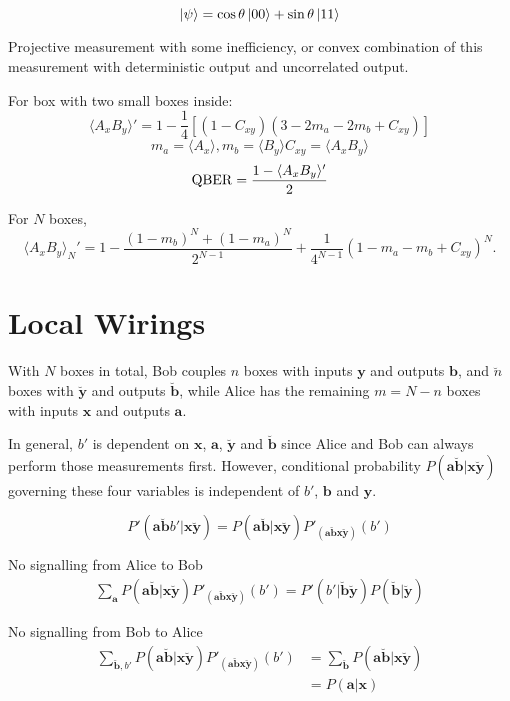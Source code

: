 \documentclass[10pt, a4paper]{article}
\newcommand{\?}{\mathrel{?}} %
\newcommand{\cvec}[1]{\boldsymbol{\mathbf{#1}}}    %
\numberwithin{equation}{section} %
\theoremstyle{definition}
\theoremstyle{plain}
\theoremstyle{plain}
\begin{document}
  \[ \ket{\psi} = \cos \theta \ket{00} + \sin \theta \ket{11} \]

  Projective measurement with some inefficiency, or convex combination of this measurement with deterministic output and uncorrelated output.

  For box with two small boxes inside:
  \[ \langle A_x B_y \rangle' = 1 - \frac{1}{4} \left[ (1 - C_{xy}) (3 - 2m_a - 2 m_b + C_{xy} ) \right] \]
      \[ m_a = \langle A_x \rangle, m_b = \langle B_y \rangle C_{xy} = \langle A_x B_y \rangle \]
      \[ {\rm QBER} = \frac{1 - \langle A_x B_y \rangle'}{2} \]

      For \(N\) boxes,
    \[ \langle A_x B_y \rangle_{N}' = 1 - \frac{{(1-m_b)}^N + {(1-m_a)}^N}{2^{N-1}} + \frac{1}{4^{N-1}} {(1-m_a-m_b+C_{xy})}^{N}. \]

    \section{Local Wirings}

    With \(N\) boxes in total, Bob couples \(n\) boxes with inputs \(\cvec{y}\) and outputs \(\cvec{b}\), and \(\breve{n}\) boxes with \(\breve{\cvec{y}}\) and outputs \(\breve{\cvec{b}}\), while Alice has the remaining \(m = N - n\) boxes with inputs \(\cvec{x}\) and outputs \(\cvec{a}\).

    In general, \(b'\) is dependent on \(\cvec{x}\), \(\cvec{a}\), \(\breve{\cvec{y}}\) and \(\breve{\cvec{b}}\) since Alice and Bob can always perform those measurements first. However, conditional probability \(P(\cvec{a}\breve{\cvec{b}}|\cvec{x}\breve{\cvec{y}})\) governing these four variables is independent of \(b'\), \(\cvec{b}\) and \(\cvec{y}\).

    \[ P'(\cvec{a}\breve{\cvec{b}}b'|\cvec{x}\breve{\cvec{y}}) = P(\cvec{a}\breve{\cvec{b}}|\cvec{x}\breve{\cvec{y}}) P'_{(\cvec{a}\breve{\cvec{b}}\cvec{x}\breve{\cvec{y}})}(b')  \]

    No signalling from Alice to Bob
    \begin{align}
      \sum_{\cvec{a}} P(\cvec{a}\breve{\cvec{b}}|\cvec{x}\breve{\cvec{y}}) P'_{(\cvec{a}\breve{\cvec{b}}\cvec{x}\breve{\cvec{y}})}(b') = P'(b'|\breve{\cvec{b}}\breve{\cvec{y}}) P(\breve{\cvec{b}}|\breve{\cvec{y}})
    \end{align}

    No signalling from Bob to Alice
    \begin{align}
      \sum_{\cvec{\breve{b}}, b'} P(\cvec{a}\breve{\cvec{b}}|\cvec{x}\breve{\cvec{y}}) P'_{(\cvec{a}\breve{\cvec{b}}\cvec{x}\breve{\cvec{y}})}(b') &= \sum_{\cvec{\breve{b}}} P(\cvec{a}\breve{\cvec{b}}|\cvec{x}\breve{\cvec{y}}) \\
                                                                                                                                                     &= P(\cvec{a}|\cvec{x})
    \end{align}
\end{document}
